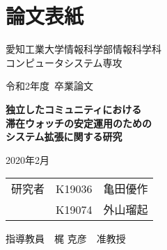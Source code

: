 \chapter{論文表紙}
\thispagestyle{myheadings}

\vspace{-1.0cm}

\begin{center}

{\LARGE 愛知工業大学情報科学部情報科学科\\
コンピュータシステム専攻

\vspace{1.0cm}

令和2年度~卒業論文\\

\vspace{2.0cm}

{\Huge 
\baselineskip=15mm
\textbf{独立したコミュニティにおける\\滞在ウォッチの安定運用のための\\システム拡張に関する研究\\}}

\vspace{7.0cm}

2020年2月\\

\vspace{1.0cm}

\begin{tabular}[h]{lll}
  研究者  & K19036 & 亀田優作\\
         & K19074 & 外山瑠起\\
         
\end{tabular}

\vspace{1.0cm}

指導教員\ \ 梶 克彦\ \
准教授}

\end{center}

